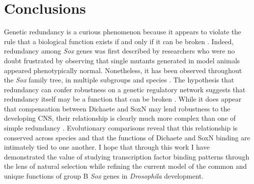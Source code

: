 \section{Conclusions}
Genetic redundancy is a curious phenomenon because it appears to violate the rule that a biological function exists if and only if it can be broken \citep{graur_immortality_2013}. Indeed, redundancy among \emph{Sox} genes was first described by researchers who were no doubt frustrated by observing that single mutants generated in model animals appeared phenotypically normal. Nonetheless, it has been observed throughout the \emph{Sox} family tree, in multiple subgroups and species \citep{bhattaram_organogenesis_2010,ferri_sox2_2004,matsui_redundant_2006,nishiguchi_sox1_1998,okuda_b1_2010,rizzoti_sox3_2004}. The hypothesis that redundancy can confer robustness on a genetic regulatory network suggests that redundancy itself may be a function that can be broken \citep{nowak_evolution_1997,tautz_redundancies_1992,wagner_distributed_2005,wagner_gene_2008}. While it does appear that compensation between Dichaete and SoxN may lend robustness to the developing CNS, their relationship is clearly much more complex than one of simple redundancy \citep{ferrero_soxneuro_2014}. Evolutionary comparisons reveal that this relationship is conserved across species and that the functions of Dichaete and SoxN binding are intimately tied to one another. I hope that through this work I have demonstrated the value of studying transcription factor binding patterns through the lens of natural selection while refining the current model of the common and unique functions of group B \emph{Sox} genes in \emph{Drosophila} development.
